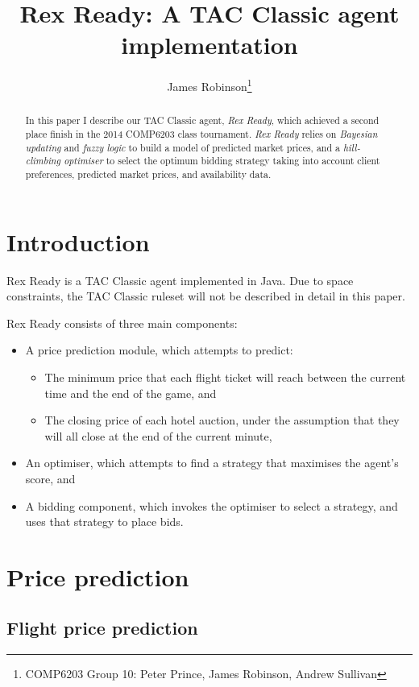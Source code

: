 \documentclass[a4paper]{proc}
\title{Rex Ready: A TAC Classic agent implementation}
\author{James Robinson\thanks{COMP6203 Group 10: Peter Prince, James Robinson, Andrew Sullivan}}
\begin{document}
\maketitle

\begin{abstract}
  In this paper I describe our TAC Classic agent, \emph{Rex Ready}, which achieved a second place finish in the 2014 COMP6203 class tournament. \emph{Rex Ready} relies on \emph{Bayesian updating} and \emph{fuzzy logic} to build a model of predicted market prices, and a \emph{hill-climbing optimiser} to select the optimum bidding strategy taking into account client preferences, predicted market prices, and availability data.
\end{abstract}

\section{Introduction}

Rex Ready is a TAC Classic agent implemented in Java. Due to space constraints, the TAC Classic ruleset will not be described in detail in this paper.

Rex Ready consists of three main components:

\begin{itemize}
  \item A price prediction module, which attempts to predict:
  \begin{itemize}
    \item The minimum price that each flight ticket will reach between the current time and the end of the game, and
    \item The closing price of each hotel auction, under the assumption that they will all close at the end of the current minute,
  \end{itemize}
  \item An optimiser, which attempts to find a strategy that maximises the agent's score, and
  \item A bidding component, which invokes the optimiser to select a strategy, and uses that strategy to place bids.
\end{itemize}

\section{Price prediction}

\subsection{Flight price prediction}
\end{document}
